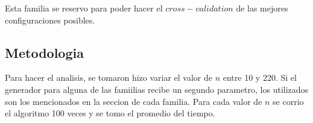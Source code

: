 Esta familia se reservo para poder hacer el $cross-validation$ de las mejores configuraciones posibles.

\subsection{Metodologia}

Para hacer el analisis, se tomaron hizo variar el valor de $n$ entre 10 y 220. Si el generador para alguna de las famiilias recibe un segundo parametro, los utilizados son los mencionados en la seccion de cada familia. Para cada valor de $n$ se corrio el algoritmo 100 veces y se tomo el promedio del tiempo.